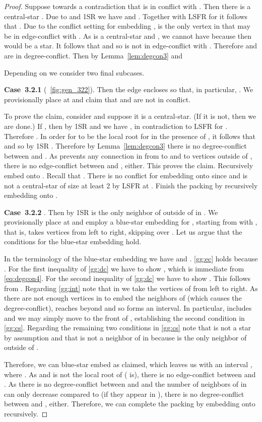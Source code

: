 \documentclass[11pt,a4paper,colorlinks=true,urlcolor=blue,citecolor=red]{article}
\theoremstyle{plain}
\newcommand{\case}[1]{\par\vspace{.5\baselineskip}\noindent\textbf{\sffamily Case~#1}}
\begin{document}
\begin{proof}
  Suppose towards a contradiction that  is in conflict with
  . Then there is a central-star .
  Due to  and 1SR we have  and .
  Together with LSFR for  it follows that
  . Due to the conflict setting for
  embedding ,  is the only vertex in  that may be
  in edge-conflict with . As  is a central-star and
  , we cannot have  because then  would be a star.
  It follows that  and so  is not in edge-conflict
  with . Therefore  and  are in degree-conflict.
  Then  by Lemma~\ref{lem:degcon3} and

Depending on  we consider two final subcases.

  \case{3.2.1} 
  (\figurename~\ref{fig:gen_322}). Then the edge 
  encloses  so that, in particular,
  . We provisionally place  at
   and claim that 
  and  are not in conflict.

  To prove the claim, consider 
  and suppose it is a central-star. (If it is not, then we are done.) If
  , then by 1SR and  we
  have , in contradiction to LSFR for .
  Therefore . In order for  to be the
  local root for  in the presence of , it
  follows that  and so by 1SR . Therefore by
  Lemma~\ref{lem:degcon3} there is no degree-conflict between
   and . As  prevents any
  connection in  from  to  and to vertices outside of
  , there is no edge-conflict between  and ,
  either. This proves the claim. Recursively embed  onto
  . Recall that . There is no conflict for
  embedding  onto  since  and
   is not a central-star of size at least 2 by
  LSFR at . Finish the packing by recursively embedding  onto
  .

  \case{3.2.2} . Then by 1SR  is the only
  neighbor of  outside of  in . We provisionally place  at
   and employ a blue-star embedding for , starting from
   with , that is,  takes
  vertices from left to right, skipping over . Let us argue
  that the conditions for the blue-star embedding hold.

  In the terminology of the blue-star embedding we have  and
  . \ref{gg:ec} holds because
  . For the first inequality of \ref{gg:dc} we have to
  show , which is immediate from
  \eqref{eq:degcon4}. For the second inequality of \ref{gg:dc} we have
  to show . This follows from
  . Regarding
  \ref{gg:int} note that in  we take the vertices of
   from left to right. As there are not enough vertices
  in  to embed the neighbors of  (which causes the
  degree-conflict),  reaches beyond  and so
   forms an interval. In particular,
   includes  and we may simply move  to
  the front of , establishing the second condition in
  \ref{gg:cs}. Regarding the remaining two conditions in
  \ref{gg:cs} note that  is not a star by assumption and that  is not
  a neighbor of  in  because  is the only neighbor of 
  outside of .

  Therefore, we can blue-star embed  as claimed, which
leaves us with an interval , where . As
   and  is not the local root of  ( is),
  there is no edge-conflict between  and . As there is no
  degree-conflict between  and  and the number of
  neighbors of  in  can only decrease compared to
   (if they appear in ), there is no
  degree-conflict between  and , either. Therefore, we can
  complete the packing by embedding  onto  recursively.
\end{proof}
\end{document}
